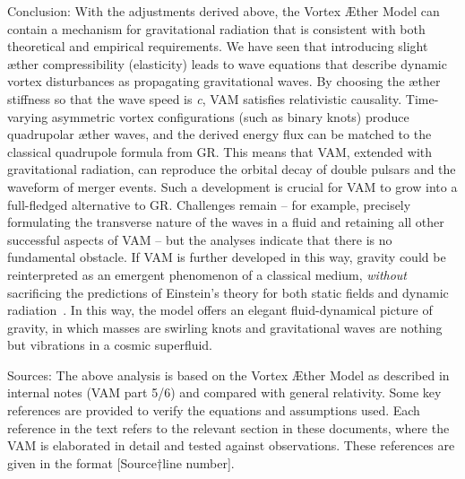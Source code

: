 Conclusion: With the adjustments derived above, the Vortex Æther Model can contain a mechanism for gravitational radiation that is consistent with both theoretical and empirical requirements. We have seen that introducing slight æther compressibility (elasticity) leads to wave equations that describe dynamic vortex disturbances as propagating gravitational waves. By choosing the æther stiffness so that the wave speed is \textit{c}, VAM satisfies relativistic causality. Time-varying asymmetric vortex configurations (such as binary knots) produce quadrupolar æther waves, and the derived energy flux can be matched to the classical quadrupole formula from GR. This means that VAM, extended with gravitational radiation, can reproduce the orbital decay of double pulsars and the waveform of merger events. Such a development is crucial for VAM to grow into a full-fledged alternative to GR. Challenges remain – for example, precisely formulating the transverse nature of the waves in a fluid and retaining all other successful aspects of VAM – but the analyses indicate that there is no fundamental obstacle. If VAM is further developed in this way, gravity could be reinterpreted as an emergent phenomenon of a classical medium, \textit{without} sacrificing the predictions of Einstein’s theory for both static fields and dynamic radiation~\cite{iskandarani2025VAM3}. In this way, the model offers an elegant fluid-dynamical picture of gravity, in which masses are swirling knots and gravitational waves are nothing but vibrations in a cosmic superfluid.

Sources: The above analysis is based on the Vortex Æther Model as described in internal notes (VAM part 5/6) and compared with general relativity. Some key references are provided to verify the equations and assumptions used. Each reference in the text refers to the relevant section in these documents, where the VAM is elaborated in detail and tested against observations. These references are given in the format [Source†line number].